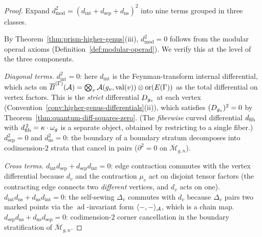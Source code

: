 \begin{proof}
Expand $d_{\mathrm{mod}}^2 = (d_{\mathrm{int}} + d_{\mathrm{sep}}
+ d_{\mathrm{ns}})^2$ into nine terms grouped in three classes.

By Theorem~\ref{thm:prism-higher-genus}(iii),
$d_{\mathrm{mod}}^2 = 0$ follows from the modular operad axioms
(Definition~\ref{def:modular-operad}).  We verify this at the
level of the three components.

\emph{Diagonal terms.}
$d_{\mathrm{int}}^2 = 0$: here $d_{\mathrm{int}}$ is the
Feynman-transform internal differential, which acts on
$\overline{B}^{(\Gamma)}(\mathcal{A}) = \bigotimes_v \mathcal{A}(g_v,
\operatorname{val}(v)) \otimes \operatorname{or}(E(\Gamma))$
as the total differential on vertex factors.  This is the
\emph{strict} differential $D_{g_v}$ at each vertex
(Convention~\ref{conv:higher-genus-differentials}(ii)), which
satisfies $(D_{g_v})^2 = 0$ by
Theorem~\ref{thm:quantum-diff-squares-zero}.  (The
\emph{fiberwise} curved differential $d_{\mathrm{fib}}$ with
$d_{\mathrm{fib}}^{\,2} = \kappa \cdot \omega_g$ is a separate object,
obtained by restricting to a single fiber.)
$d_{\mathrm{sep}}^2 = 0$ and $d_{\mathrm{ns}}^2 = 0$:
the boundary of a boundary stratum decomposes into
codimension-$2$ strata that cancel in pairs
($\partial^2 = 0$ on $\overline{\mathcal{M}}_{g,n}$).

\emph{Cross terms.}
$d_{\mathrm{int}} d_{\mathrm{sep}} + d_{\mathrm{sep}}
d_{\mathrm{int}} = 0$: edge contraction commutes with the vertex
differential because $d_v$ and the contraction $\mu_e$ act on
disjoint tensor factors (the contracting edge connects two
\emph{different} vertices, and $d_v$ acts on one).
$d_{\mathrm{int}} d_{\mathrm{ns}} + d_{\mathrm{ns}}
d_{\mathrm{int}} = 0$: the self-sewing $\Delta_v$ commutes with
$d_v$ because $\Delta_v$ pairs two marked points via the
$\operatorname{ad}$-invariant form $\langle -,- \rangle_{\mathcal{A}}$,
which is a chain map.
$d_{\mathrm{sep}} d_{\mathrm{ns}} + d_{\mathrm{ns}}
d_{\mathrm{sep}} = 0$: codimension-$2$ corner cancellation
in the boundary stratification of $\overline{\mathcal{M}}_{g,n}$.
\end{proof}

